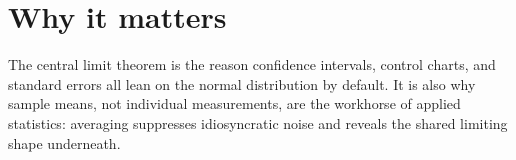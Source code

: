 \documentclass[11pt]{article}
\begin{document}
\section{Why it matters}

The central limit theorem is the reason confidence intervals, control
charts, and standard errors all lean on the normal distribution by
default. It is also why sample means, not individual measurements, are
the workhorse of applied statistics: averaging suppresses idiosyncratic
noise and reveals the shared limiting shape underneath.
\end{document}
